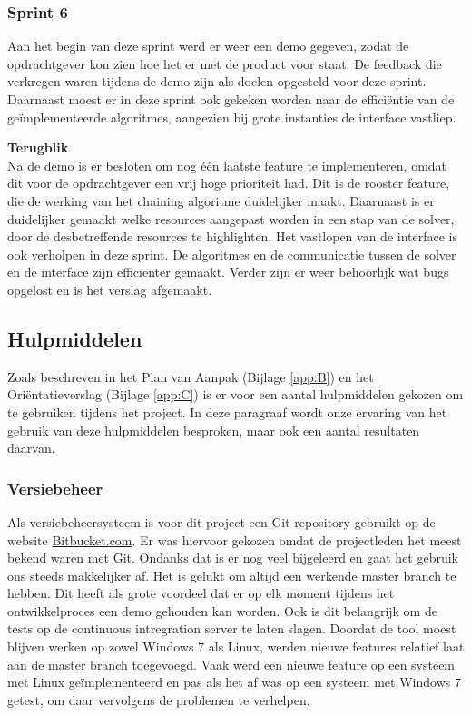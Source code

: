 \subsubsection{Sprint 6}
Aan het begin van deze sprint werd er weer een demo gegeven, zodat de opdrachtgever kon zien hoe het er met de product voor staat. De feedback die verkregen waren tijdens de demo zijn als doelen opgesteld voor deze sprint. Daarnaast moest er in deze sprint ook gekeken worden naar de effici\"entie van de ge\"implementeerde algoritmes, aangezien bij grote instanties de interface vastliep.

\textbf{Terugblik} \\
Na de demo is er besloten om nog \'e\'en laatste feature te implementeren, omdat dit voor de opdrachtgever een vrij hoge prioriteit had. Dit is de rooster feature, die de werking van het chaining algoritme duidelijker maakt. Daarnaast is er duidelijker gemaakt welke resources aangepast worden in een stap van de solver, door de desbetreffende resources te highlighten. Het vastlopen van de interface is ook verholpen in deze sprint. De algoritmes en de communicatie tussen de solver en de interface zijn effici\"enter gemaakt. Verder zijn er weer behoorlijk wat bugs opgelost en is het verslag afgemaakt. 

\subsection{Hulpmiddelen}
Zoals beschreven in het Plan van Aanpak (Bijlage \ref{app:B}) en het Ori\"entatieverslag (Bijlage \ref{app:C}) is er voor een aantal hulpmiddelen gekozen om te gebruiken tijdens het project. In deze paragraaf wordt onze ervaring van het gebruik van deze hulpmiddelen besproken, maar ook een aantal resultaten daarvan. 

\subsubsection{Versiebeheer}
\label{subsec:versiebeheer}
Als versiebeheersysteem is voor dit project een Git repository gebruikt op de website \href{http://bitbucket.com}{Bitbucket.com}. Er was hiervoor gekozen omdat de projectleden het meest bekend waren met Git. Ondanks dat is er nog veel bijgeleerd en gaat het gebruik ons steeds makkelijker af. Het is gelukt om altijd een werkende master branch te hebben. Dit heeft als grote voordeel dat er op elk moment tijdens het ontwikkelproces een demo gehouden kan worden. Ook is dit belangrijk om de tests op de continuous intregration server te laten slagen. Doordat de tool moest blijven werken op zowel Windows 7 als Linux, werden nieuwe features relatief laat aan de master branch toegevoegd. Vaak werd een nieuwe feature op een systeem met Linux ge\"implementeerd en pas als het af was op een systeem met Windows 7 getest, om daar vervolgens de problemen te verhelpen.

